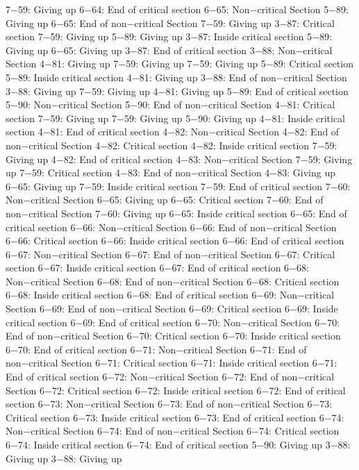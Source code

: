 7−59: Giving up
6−64: End of critical section
6−65: Non−critical Section
5−89: Giving up
6−65: End of non−critical Section
7−59: Giving up
3−87: Critical section
7−59: Giving up
5−89: Giving up
3−87: Inside critical section
5−89: Giving up
6−65: Giving up
3−87: End of critical section
3−88: Non−critical Section
4−81: Giving up
7−59: Giving up
7−59: Giving up
5−89: Critical section
5−89: Inside critical section
4−81: Giving up
3−88: End of non−critical Section
3−88: Giving up
7−59: Giving up
4−81: Giving up
5−89: End of critical section
5−90: Non−critical Section
5−90: End of non−critical Section
4−81: Critical section
7−59: Giving up
7−59: Giving up
5−90: Giving up
4−81: Inside critical section
4−81: End of critical section
4−82: Non−critical Section
4−82: End of non−critical Section
4−82: Critical section
4−82: Inside critical section
7−59: Giving up
4−82: End of critical section
4−83: Non−critical Section
7−59: Giving up
7−59: Critical section
4−83: End of non−critical Section
4−83: Giving up
6−65: Giving up
7−59: Inside critical section
7−59: End of critical section
7−60: Non−critical Section
6−65: Giving up
6−65: Critical section
7−60: End of non−critical Section
7−60: Giving up
6−65: Inside critical section
6−65: End of critical section
6−66: Non−critical Section
6−66: End of non−critical Section
6−66: Critical section
6−66: Inside critical section
6−66: End of critical section
6−67: Non−critical Section
6−67: End of non−critical Section
6−67: Critical section
6−67: Inside critical section
6−67: End of critical section
6−68: Non−critical Section
6−68: End of non−critical Section
6−68: Critical section
6−68: Inside critical section
6−68: End of critical section
6−69: Non−critical Section
6−69: End of non−critical Section
6−69: Critical section
6−69: Inside critical section
6−69: End of critical section
6−70: Non−critical Section
6−70: End of non−critical Section
6−70: Critical section
6−70: Inside critical section
6−70: End of critical section
6−71: Non−critical Section
6−71: End of non−critical Section
6−71: Critical section
6−71: Inside critical section
6−71: End of critical section
6−72: Non−critical Section
6−72: End of non−critical Section
6−72: Critical section
6−72: Inside critical section
6−72: End of critical section
6−73: Non−critical Section
6−73: End of non−critical Section
6−73: Critical section
6−73: Inside critical section
6−73: End of critical section
6−74: Non−critical Section
6−74: End of non−critical Section
6−74: Critical section
6−74: Inside critical section
6−74: End of critical section
5−90: Giving up
3−88: Giving up
3−88: Giving up
